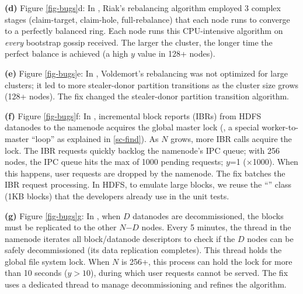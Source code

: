 {\bf (d)} Figure \ref{fig-bugs}d: In \riakone \cite{RIAK-One}, Riak's
rebalancing algorithm employed 3 complex stages (claim-target, claim-hole,
full-rebalance) that each node runs to converge to a perfectly balanced
ring.  Each node runs this CPU-intensive algorithm on {\em every}
bootstrap gossip received.  The larger the cluster, the longer time the
perfect balance is achieved (a high $y$ value in 128+ nodes).


{\bf (e)} Figure \ref{fig-bugs}e: In \voldone \cite{VOLD-One}, Voldemort's
rebalancing was not optimized for large clusters; it led to more
stealer-donor partition transitions as the cluster size grows (128+
nodes).  The fix changed the stealer-donor partition transition algorithm.







{\bf (f)} Figure \ref{fig-bugs}f: In \hdone \cite{HDFS-One}, incremental
block reports (IBRs) from HDFS datanodes to the namenode acquires the
global master lock (\ie, a special worker-to-master ``loop'' as explained
in \sec\ref{sc-find}).  As $N$ grows, more IBR calls acquire the lock.
The IBR requests quickly backlog the namenode's IPC queue; with 256 nodes, the IPC queue
hits the max of 1000 pending requests; $y$=1 ($\times$1000).  When this
happens, user requests are dropped by the namenode.  The fix batches the
IBR request processing.
%
In HDFS, to emulate large blocks, we reuse the ``'' class
(1KB blocks) that the developers already use in the unit tests.


{\bf (g)} Figure \ref{fig-bugs}g: In \hdtwo \cite{HDFS-Two}, when $D$
datanodes are decommissioned, the blocks must be replicated to the other
$N$$-$$D$ nodes.
%
Every 5 minutes, the  thread in the namenode
iterates all block/datanode descriptors to check if the $D$ nodes can be
safely decommissioned (its data replication completes).  This thread holds
the global file system lock.  When $N$ is 256+, this process can hold the
lock for more than 10 seconds ($y$$>$$10$), during which user requests
cannot be served.
%
The fix uses a dedicated thread to manage decommissioning and refines the
algorithm.


